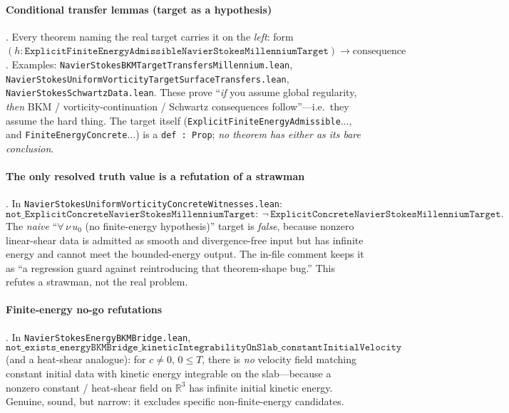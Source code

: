 \paragraph{Conditional transfer lemmas (target as a hypothesis)}
. Every theorem naming the real target carries it on the
\emph{left}: form
$(h:\texttt{ExplicitFiniteEnergyAdmissibleNavierStokesMillenniumTarget})
\to \text{consequence}$. Examples:
\texttt{NavierStokesBKMTargetTransfersMillennium.lean},
\texttt{NavierStokesUniformVorticityTargetSurfaceTransfers.lean},
\texttt{NavierStokesSchwartzData.lean}. These prove ``\emph{if} you assume global
regularity, \emph{then} BKM / vorticity-continuation / Schwartz consequences
follow''---i.e.\ they assume the hard thing. The target itself
(\texttt{ExplicitFiniteEnergyAdmissible$\dots$}, and
\texttt{FiniteEnergyConcrete$\dots$}) is a \texttt{def : Prop}; \emph{no theorem
has either as its bare conclusion}.

\paragraph{The only resolved truth value is a refutation of a strawman}
. In
\texttt{NavierStokesUniformVorticityConcreteWitnesses.lean}:
\[
\texttt{not\_ExplicitConcreteNavierStokesMillenniumTarget}
:\ \lnot\,\texttt{ExplicitConcreteNavierStokesMillenniumTarget}.
\]
The \emph{naive} ``$\forall\,\nu\,u_0$ (no finite-energy hypothesis)'' target is
\emph{false}, because nonzero linear-shear data is admitted as smooth and
divergence-free input but has infinite energy and cannot meet the bounded-energy
output. The in-file comment keeps it as ``a regression guard against
reintroducing that theorem-shape bug.'' This refutes a strawman, not the real
problem.

\paragraph{Finite-energy no-go refutations}
. In
\texttt{NavierStokesEnergyBKMBridge.lean},
\[
\texttt{not\_exists\_energyBKMBridge\_kineticIntegrabilityOnSlab\_constantInitialVelocity}
\]
(and a heat-shear analogue): for $c\neq 0$, $0\le T$, there is \emph{no}
velocity field matching constant initial data with kinetic energy integrable on
the slab---because a nonzero constant / heat-shear field on $\mathbb{R}^3$ has
infinite initial kinetic energy. Genuine, sound, but narrow: it excludes
specific non-finite-energy candidates.

